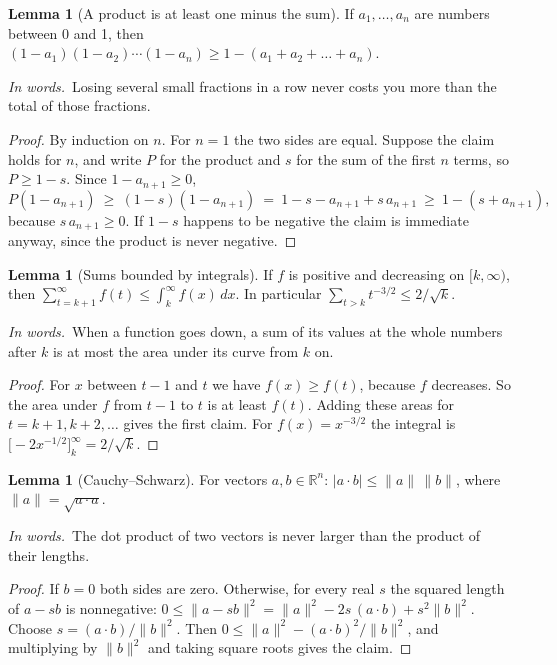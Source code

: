 \documentclass[11pt]{article}
\newcommand{\R}{\mathbb R}\newcommand{\expl}{\mathrm{expl}}
\theoremstyle{definition}
\newtheorem{lemma}[definition]{Lemma}
\newcommand{\inwords}{\par\smallskip\noindent\textit{In words.}\ }
\begin{document}
\begin{lemma}[A product is at least one minus the sum]\label{lem:prodsum}
If $a_1,\dots,a_n$ are numbers between 0 and 1, then $(1-a_1)(1-a_2)\cdots(1-a_n)\ge1-(a_1+a_2+\dots+a_n)$.
\inwords Losing several small fractions in a row never costs you more than the total of those fractions.
\end{lemma}
\begin{proof}
By induction on $n$. For $n=1$ the two sides are equal. Suppose the claim holds for $n$, and write $P$ for the product
and $s$ for the sum of the first $n$ terms, so $P\ge1-s$. Since $1-a_{n+1}\ge0$,
\[ P(1-a_{n+1})\ \ge\ (1-s)(1-a_{n+1})\ =\ 1-s-a_{n+1}+s\,a_{n+1}\ \ge\ 1-(s+a_{n+1}), \]
because $s\,a_{n+1}\ge0$. If $1-s$ happens to be negative the claim is immediate anyway, since the product is never
negative.
\end{proof}

\begin{lemma}[Sums bounded by integrals]\label{lem:integral}
If $f$ is positive and decreasing on $[k,\infty)$, then $\sum_{t=k+1}^{\infty}f(t)\le\int_k^\infty f(x)\,dx$. In
particular $\sum_{t>k}t^{-3/2}\le2/\sqrt k$.
\inwords When a function goes down, a sum of its values at the whole numbers after $k$ is at most the area under its
curve from $k$ on.
\end{lemma}
\begin{proof}
For $x$ between $t-1$ and $t$ we have $f(x)\ge f(t)$, because $f$ decreases. So the area under $f$ from $t-1$ to $t$ is
at least $f(t)$. Adding these areas for $t=k+1,k+2,\dots$ gives the first claim. For $f(x)=x^{-3/2}$ the integral is
$\big[-2x^{-1/2}\big]_k^\infty=2/\sqrt k$.
\end{proof}

\begin{lemma}[Cauchy--Schwarz]\label{lem:cs}
For vectors $a,b\in\R^n$: \quad $|a\cdot b|\le\|a\|\,\|b\|$, where $\|a\|=\sqrt{a\cdot a}$.
\inwords The dot product of two vectors is never larger than the product of their lengths.
\end{lemma}
\begin{proof}
If $b=0$ both sides are zero. Otherwise, for every real $s$ the squared length of $a-sb$ is nonnegative:
$0\le\|a-sb\|^2=\|a\|^2-2s\,(a\cdot b)+s^2\|b\|^2$. Choose $s=(a\cdot b)/\|b\|^2$. Then
$0\le\|a\|^2-(a\cdot b)^2/\|b\|^2$, and multiplying by $\|b\|^2$ and taking square roots gives the claim.
\end{proof}
\end{document}
